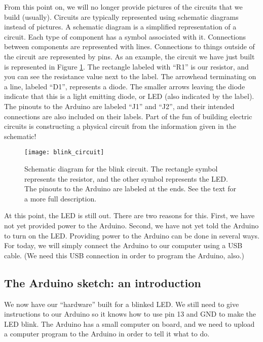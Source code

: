 From this point on, we will no longer provide pictures of the circuits that
we build (usually). Circuits are typically represented using schematic diagrams
instead of pictures. A schematic diagram is a simplified representation of
a circuit. Each type of component has a symbol associated with it. Connections
between components are represented with lines. Connections to things outside
of the circuit are represented by pins. As an example, the circuit we have
just built is represented in Figure \ref{fig:blink_circuit}. The rectangle 
labeled with ``R1'' is our resistor, and you can see the resistance value
next to the label. The arrowhead terminating on a line, labeled ``D1'', 
represents a diode. The smaller arrows leaving the diode indicate that this 
is a light emitting diode, or LED (also indicated by the label). The pinouts to 
the Arduino are labeled ``J1'' and ``J2'', and their intended connections are
also included on their labels. Part of the fun of building electric circuits is 
constructing a physical circuit 
from the information given in the schematic!
\begin{figure}[hbp!]
\centering
\texttt{[image: blink\_circuit]}
\caption[Schematic diagram for the blink circuit]{Schematic diagram for the
blink circuit. The rectangle symbol represents the resistor, and the other
symbol represents the LED. The pinouts to the Arduino are labeled at the ends.
See the text for a more full description.}
\label{fig:blink_circuit}
\end{figure}

At this point, the LED is still out. There are two reasons for this. First, we
have not yet provided power to the Arduino. Second, we have not yet told the 
Arduino to turn on the LED. Providing power to the Arduino can be done in
several ways. For today, we will simply connect the Arduino to our computer
using a USB cable. (We need this USB connection in order to program the
Arduino, also.)

\subsection{The Arduino sketch: an introduction}

We now have our ``hardware'' built for a blinked LED. We still need to 
give instructions to our Arduino so it knows how to use pin 13 and GND to
make the LED blink. The Arduino has a small computer on board, and we need
to upload a computer program to the Arduino in order to tell it what to do.

